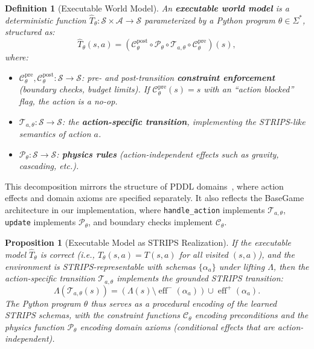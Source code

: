 \documentclass{article}
\newtheorem{definition}{Definition}
\newtheorem{proposition}{Proposition}
\DeclareMathOperator{\eff}{eff}
\newcommand{\calS}{\mathcal{S}}
\newcommand{\calA}{\mathcal{A}}
\newcommand{\calC}{\mathcal{C}}
\newcommand{\calP}{\mathcal{P}}
\newcommand{\calT}{\mathcal{T}}
\begin{document}
\begin{definition}[Executable World Model]
\label{def:exec_model}
An \textbf{executable world model} is a deterministic function $\hat{T}_\theta : \calS \times \calA \to \calS$ parameterized by a Python program $\theta \in \Sigma^*$, structured as:
\begin{equation}
\label{eq:model_structure}
\hat{T}_\theta(s, a) = (\calC^{\text{post}}_\theta \circ \calP_\theta \circ \calT_{a,\theta} \circ \calC^{\text{pre}}_\theta)(s),
\end{equation}
where:
\begin{itemize}[nosep]
    \item $\calC^{\text{pre}}_\theta, \calC^{\text{post}}_\theta : \calS \to \calS$: pre- and post-transition \textbf{constraint enforcement} (boundary checks, budget limits).  If $\calC^{\text{pre}}_\theta(s) = s$ with an ``action blocked'' flag, the action is a no-op.
    \item $\calT_{a,\theta} : \calS \to \calS$: the \textbf{action-specific transition}, implementing the STRIPS-like semantics of action $a$.
    \item $\calP_\theta : \calS \to \calS$: \textbf{physics rules} (action-independent effects such as gravity, cascading, etc.).
\end{itemize}
\end{definition}

This decomposition mirrors the structure of PDDL domains~\cite{fox2003pddl2}, where action effects and domain axioms are specified separately.  It also reflects the BaseGame architecture in our implementation, where \texttt{handle\_action} implements $\calT_{a,\theta}$, \texttt{update} implements $\calP_\theta$, and boundary checks implement $\calC_\theta$.

\begin{proposition}[Executable Model as STRIPS Realization]
\label{prop:strips_realization}
If the executable model $\hat{T}_\theta$ is correct (i.e., $\hat{T}_\theta(s, a) = T(s, a)$ for all visited $(s, a)$), and the environment is STRIPS-representable with schemas $\{\alpha_a\}$ under lifting $\Lambda$, then the action-specific transition $\calT_{a,\theta}$ implements the grounded STRIPS transition:
\begin{equation}
\Lambda(\calT_{a,\theta}(s)) = (\Lambda(s) \setminus \eff^-(\alpha_a)) \cup \eff^+(\alpha_a).
\end{equation}
The Python program $\theta$ thus serves as a procedural encoding of the learned STRIPS schemas, with the constraint functions $\calC_\theta$ encoding preconditions and the physics function $\calP_\theta$ encoding domain axioms (conditional effects that are action-independent).
\end{proposition}
\end{document}
